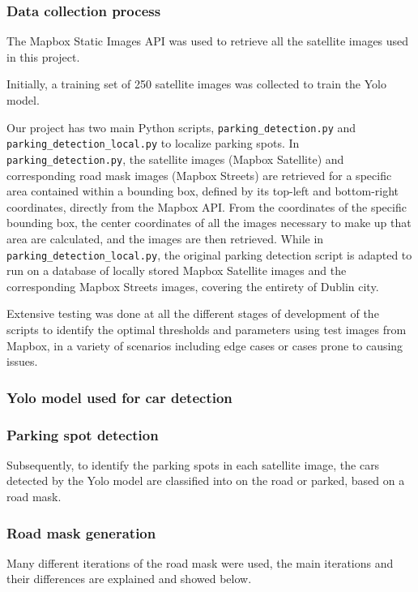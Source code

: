 \subsubsection{Data collection process}
The Mapbox Static Images API was used to retrieve all the satellite images used in this project.

Initially, a training set of 250 satellite images was collected to train the Yolo model.

Our project has two main Python scripts, \texttt{parking\_detection.py} and \texttt{parking\_detection\_local.py} to localize parking spots.
In \texttt{parking\_detection.py}, the satellite images (Mapbox Satellite) and corresponding road mask images (Mapbox Streets) are retrieved for a specific area contained within a bounding box, defined by its top-left and bottom-right coordinates, directly from the Mapbox API.
From the coordinates of the specific bounding box, the center coordinates of all the images necessary to make up that area are calculated, and the images are then retrieved.
While in \texttt{parking\_detection\_local.py}, the original parking detection script is adapted to run on a database of locally stored Mapbox Satellite images and the corresponding Mapbox Streets images, covering the entirety of Dublin city.

Extensive testing was done at all the different stages of development of the scripts to identify the optimal thresholds and parameters using test images from Mapbox, in a variety of scenarios including edge cases or cases prone to causing issues.

\subsubsection{Yolo model used for car detection}


\subsubsection{Parking spot detection}
Subsequently, to identify the parking spots in each satellite image, the cars detected by the Yolo model are classified into on the road or parked, based on a road mask.

\subsubsection{Road mask generation}
Many different iterations of the road mask were used, the main iterations and their differences are explained and showed below.

